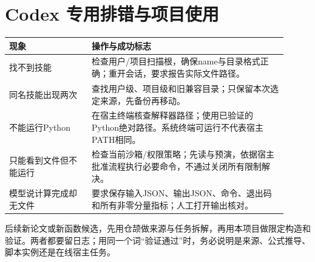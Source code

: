 \section{Codex 专用排错与项目使用}
\begin{longtable}{p{0.27\linewidth}p{0.64\linewidth}}
\toprule 现象 & 操作与成功标志 \\ \midrule
找不到技能 & 检查用户/项目扫描根，确保name与目录格式正确；重开会话，要求报告实际文件路径。\\
同名技能出现两次 & 查找用户级、项目级和旧兼容目录；只保留本次选定来源，先备份再移动。\\
不能运行Python & 在宿主终端核查解释器路径；使用已验证的Python绝对路径。系统终端可运行不代表宿主PATH相同。\\
只能看到文件但不能运行 & 检查当前沙箱/权限策略；先读与预演，依据宿主批准流程执行必要命令，不通过关闭所有限制解决。\\
模型说计算完成却无文件 & 要求保存输入JSON、输出JSON、命令、退出码和所有非零分量指标；人工打开输出核对。\\
\bottomrule
\end{longtable}
后续新论文或新函数候选，先用仓颉做来源与任务拆解，再用本项目做限定构造和验证。两者都要留日志；用同一个词“验证通过”时，务必说明是来源、公式推导、脚本实例还是在线宿主任务。

